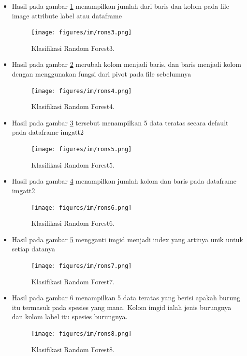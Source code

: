 \begin{enumerate}
\begin{itemize}
\item Hasil pada gambar \ref{rons3} menampilkan jumlah dari baris dan kolom pada file image attribute label atau dataframe
 		\begin{figure}[ht]
		\centerline{\texttt{[image: figures/im/rons3.png]}}
		\caption{Klasifikasi Random Forest3.}
		\label{rons3}
		\end{figure}

\item Hasil pada gambar \ref{rons4} merubah kolom menjadi baris, dan baris menjadi kolom dengan menggunakan fungsi dari pivot pada file sebelumnya
 		\begin{figure}[ht]
		\centerline{\texttt{[image: figures/im/rons4.png]}}
		\caption{Klasifikasi Random Forest4.}
		\label{rons4}
		\end{figure}

\item Hasil pada gambar \ref{rons5} tersebut menampilkan 5 data teratas secara default pada dataframe imgatt2
 		\begin{figure}[ht]
		\centerline{\texttt{[image: figures/im/rons5.png]}}
		\caption{Klasifikasi Random Forest5.}
		\label{rons5}
		\end{figure}

\item Hasil pada gambar \ref{rons6} menampilkan jumlah kolom dan baris pada dataframe imgatt2
 		\begin{figure}[ht]
		\centerline{\texttt{[image: figures/im/rons6.png]}}
		\caption{Klasifikasi Random Forest6.}
		\label{rons6}
		\end{figure}

\item Hasil pada gambar \ref{rons7} mengganti imgid menjadi index yang artinya unik untuk setiap datanya
 		\begin{figure}[ht]
		\centerline{\texttt{[image: figures/im/rons7.png]}}
		\caption{Klasifikasi Random Forest7.}
		\label{rons7}
		\end{figure}

\item Hasil pada gambar \ref{rons8} menampilkan 5 data teratas yang berisi apakah burung itu termasuk pada spesies yang mana. Kolom imgid ialah jenis burungnya dan kolom label itu spesies burungnya.
 		\begin{figure}[ht]
		\centerline{\texttt{[image: figures/im/rons8.png]}}
		\caption{Klasifikasi Random Forest8.}
		\label{rons8}
		\end{figure}


\end{itemize}
\end{enumerate}
